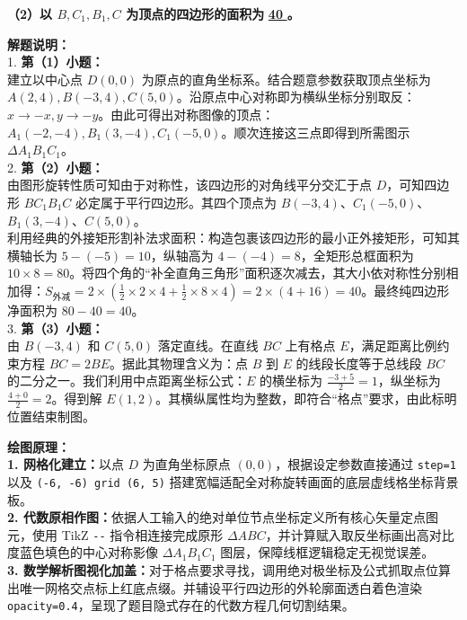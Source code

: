 \documentclass[12pt, a4paper]{ctexrep}
\begin{document}
\vspace{0.6cm}

\textbf{（2）以 $B, C_1, B_1, C$ 为顶点的四边形的面积为} \underline{\quad \textbf{40} \quad} \textbf{。}

\vspace{0.6cm}

{\small\color{gray}
\textbf{解题说明：}\\
1. \textbf{第（1）小题：}\\
建立以中心点 $D(0,0)$ 为原点的直角坐标系。结合题意参数获取顶点坐标为 $A(2,4), B(-3,4), C(5,0)$。沿原点中心对称即为横纵坐标分别取反：$x \rightarrow -x, y \rightarrow -y$。由此可得出对称图像的顶点：$A_1(-2,-4), B_1(3,-4), C_1(-5,0)$。顺次连接这三点即得到所需图示 $\Delta A_1B_1C_1$。\\
2. \textbf{第（2）小题：}\\
由图形旋转性质可知由于对称性，该四边形的对角线平分交汇于点 $D$，可知四边形 $BC_1B_1C$ 必定属于平行四边形。其四个顶点为 $B(-3,4)$、$C_1(-5,0)$、$B_1(3,-4)$、$C(5,0)$。\\
利用经典的外接矩形割补法求面积：构造包裹该四边形的最小正外接矩形，可知其横轴长为 $5 - (-5) = 10$，纵轴高为 $4 - (-4) = 8$，全矩形总框面积为 $10 \times 8 = 80$。将四个角的“补全直角三角形”面积逐次减去，其大小依对称性分别相加得：$S_\text{外减} = 2 \times (\frac{1}{2} \times 2 \times 4 + \frac{1}{2} \times 8 \times 4) = 2 \times (4 + 16) = 40$。最终纯四边形净面积为 $80 - 40 = 40$。\\
3. \textbf{第（3）小题：}\\
由 $B(-3,4)$ 和 $C(5,0)$ 落定直线。在直线 $BC$ 上有格点 $E$，满足距离比例约束方程 $BC=2BE$。据此其物理含义为：点 $B$ 到 $E$ 的线段长度等于总线段 $BC$ 的二分之一。我们利用中点距离坐标公式：$E$ 的横坐标为 $\frac{-3+5}{2} = 1$，纵坐标为 $\frac{4+0}{2}=2$。得到解 $E(1, 2)$。其横纵属性均为整数，即符合“格点”要求，由此标明位置结束制图。
}

\vspace{0.6cm}

{\small\color{blue!70!black}
\textbf{绘图原理：}\\
\textbf{1. 网格化建立：}以点 $D$ 为直角坐标原点 $(0,0)$，根据设定参数直接通过 \texttt{step=1} 以及 \texttt{(-6, -6) grid (6, 5)} 搭建宽幅适配全对称旋转画面的底层虚线格坐标背景板。\\
\textbf{2. 代数原相作图：}依据人工输入的绝对单位节点坐标定义所有核心矢量定点图元，使用 TikZ \texttt{-{}-{}} 指令相连接完成原形 $\Delta ABC$，并计算赋入取反坐标画出高对比度蓝色填色的中心对称影像 $\Delta A_1B_1C_1$ 图层，保障线框逻辑稳定无视觉误差。\\
\textbf{3. 数学解析图视化加盖：}对于格点要求寻找，调用绝对极坐标及公式抓取点位算出唯一网格交点标上红底点缀。并辅设平行四边形的外轮廓面透白着色渲染 \texttt{opacity=0.4}，呈现了题目隐式存在的代数方程几何切割结果。
}
\end{document}
